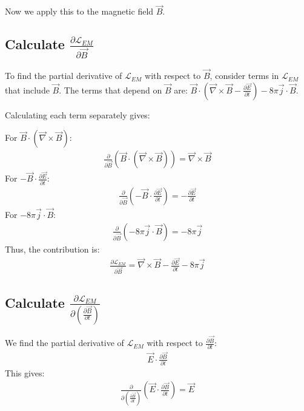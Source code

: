 \begin{enumerate}
Now we apply this to the magnetic field $\vec{B}$.
\subsection*{Calculate $\displaystyle\frac{\partial \mathcal{L}_{EM}}{\partial \vec{B}}$}

To find the partial derivative of $\mathcal{L}_{EM}$ with respect to $\vec{B}$, consider terms in $\mathcal{L}_{EM}$ that include $\vec{B}$. The terms that depend on $\vec{B}$ are: $\displaystyle\vec{B} \cdot \left( \vec{\nabla} \times \vec{B} - \frac{\partial \vec{E}}{\partial t} \right)-8\pi \vec{j} \cdot \vec{B}$.

Calculating each term separately gives:

For $\displaystyle\vec{B} \cdot (\vec{\nabla} \times \vec{B})$:
\begin{align}
  \frac{\partial}{\partial \vec{B}} \left( \vec{B} \cdot (\vec{\nabla} \times \vec{B}) \right) = \vec{\nabla} \times \vec{B}\label{eq:important-step-5}
\end{align}
For $\displaystyle-\vec{B} \cdot \frac{\partial \vec{E}}{\partial t}$:
\begin{align}
  \frac{\partial}{\partial \vec{B}} \left( -\vec{B} \cdot \frac{\partial \vec{E}}{\partial t} \right) = -\frac{\partial \vec{E}}{\partial t}\label{eq:important-step-6}
\end{align}
For $\displaystyle-8\pi \vec{j} \cdot \vec{B}$:
\begin{align}
  \frac{\partial}{\partial \vec{B}} \left( -8\pi \vec{j} \cdot \vec{B} \right) = -8\pi \vec{j}\label{eq:important-step-7}
\end{align}
Thus, the contribution is:
\begin{align}
    \frac{\partial \mathcal{L}_{EM}}{\partial \vec{B}} = \vec{\nabla} \times \vec{B} - \frac{\partial \vec{E}}{\partial t} - 8\pi \vec{j}\label{eq:important-step-8}
\end{align}
\subsection*{Calculate $\displaystyle\frac{\partial \mathcal{L}_{EM}}{\displaystyle\partial \left(\frac{\partial \vec{B}}{\partial t}\right)}$}
We find the partial derivative of $\mathcal{L}_{EM}$ with respect to $\displaystyle\frac{\partial \vec{B}}{\partial t}$:
\begin{align}
    \vec{E} \cdot \frac{\partial \vec{B}}{\partial t}\label{eq:important-step-9}
\end{align}
This gives:
\begin{align}
    \frac{\partial}{\displaystyle\partial \left(\frac{\partial \vec{B}}{\partial t}\right)} \left( \vec{E} \cdot \frac{\partial \vec{B}}{\partial t} \right) = \vec{E}\label{eq:important-step-10}
\end{align}

\end{enumerate}
